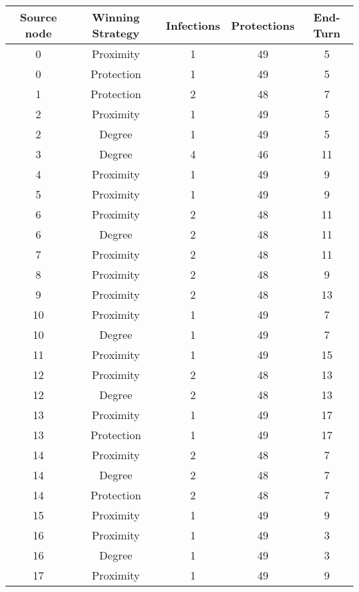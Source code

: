 \documentclass[results.tex]{subfiles}
\begin{document}
\begin{center}
  \begin{tabular}{| c || c | c | c | c |}
    \hline
    {\bfseries Source node} & {\bfseries Winning Strategy} & {\bfseries Infections} & {\bfseries Protections} & {\bfseries End-Turn} \\  %
    \hline\hline
    0 & Proximity & 1 & 49 & 5 \\ 
    \hline
    0 & Protection & 1 & 49 & 5 \\ 
    \hline
    1 & Protection & 2 & 48 & 7 \\ 
    \hline
    2 & Proximity & 1 & 49 & 5 \\ 
    \hline
    2 & Degree & 1 & 49 & 5 \\ 
    \hline
    3 & Degree & 4 & 46 & 11 \\ 
    \hline
    4 & Proximity & 1 & 49 & 9 \\ 
    \hline
    5 & Proximity & 1 & 49 & 9 \\ 
    \hline
    6 & Proximity & 2 & 48 & 11 \\ 
    \hline
    6 & Degree & 2 & 48 & 11 \\ 
    \hline
    7 & Proximity & 2 & 48 & 11 \\ 
    \hline
    8 & Proximity & 2 & 48 & 9 \\ 
    \hline
    9 & Proximity & 2 & 48 & 13 \\ 
    \hline
    10 & Proximity & 1 & 49 & 7 \\ 
    \hline
    10 & Degree & 1 & 49 & 7 \\ 
    \hline
    11 & Proximity & 1 & 49 & 15 \\ 
    \hline
    12 & Proximity & 2 & 48 & 13 \\ 
    \hline
    12 & Degree & 2 & 48 & 13 \\ 
    \hline
    13 & Proximity & 1 & 49 & 17 \\ 
    \hline
    13 & Protection & 1 & 49 & 17 \\ 
    \hline
    14 & Proximity & 2 & 48 & 7 \\ 
    \hline
    14 & Degree & 2 & 48 & 7 \\ 
    \hline
    14 & Protection & 2 & 48 & 7 \\ 
    \hline
    15 & Proximity & 1 & 49 & 9 \\ 
    \hline
    16 & Proximity & 1 & 49 & 3 \\ 
    \hline
    16 & Degree & 1 & 49 & 3 \\ 
    \hline
    17 & Proximity & 1 & 49 & 9 \\ 

\end{tabular}
\end{center}
\end{document}
